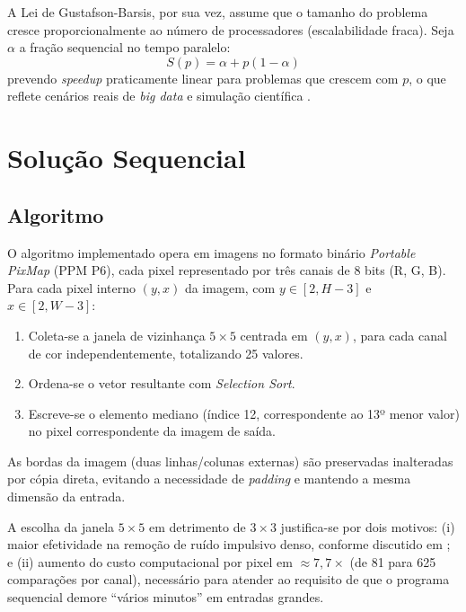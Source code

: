 \documentclass[12pt]{article}
\begin{document}
A Lei de Gustafson-Barsis, por sua vez, assume que o tamanho do problema cresce proporcionalmente ao número de processadores (escalabilidade fraca). Seja $\alpha$ a fração sequencial no tempo paralelo:
\begin{equation}
	S(p) = \alpha + p(1 - \alpha)
\end{equation}
prevendo \textit{speedup} praticamente linear para problemas que crescem com $p$, o que reflete cenários reais de \textit{big data} e simulação científica \cite{eijkhout2022arthpc1}.

\newpage
\section{Solução Sequencial}

\subsection{Algoritmo}

O algoritmo implementado opera em imagens no formato binário \textit{Portable PixMap} (PPM P6), cada pixel representado por três canais de 8 bits (R, G, B). Para cada pixel interno $(y, x)$ da imagem, com $y \in [2, H - 3]$ e $x \in [2, W - 3]$:

\begin{enumerate}
	\item Coleta-se a janela de vizinhança $5 \times 5$ centrada em $(y, x)$, para cada canal de cor independentemente, totalizando 25 valores.
	\item Ordena-se o vetor resultante com \textit{Selection Sort}.
	\item Escreve-se o elemento mediano (índice 12, correspondente ao 13º menor valor) no pixel correspondente da imagem de saída.
\end{enumerate}

As bordas da imagem (duas linhas/colunas externas) são preservadas inalteradas por cópia direta, evitando a necessidade de \textit{padding} e mantendo a mesma dimensão da entrada.

A escolha da janela $5 \times 5$ em detrimento de $3 \times 3$ justifica-se por dois motivos: (i) maior efetividade na remoção de ruído impulsivo denso, conforme discutido em \cite{gonzalez2010processamento}; e (ii) aumento do custo computacional por pixel em $\approx 7{,}7\times$ (de 81 para 625 comparações por canal), necessário para atender ao requisito de que o programa sequencial demore ``vários minutos'' em entradas grandes.
\end{document}
